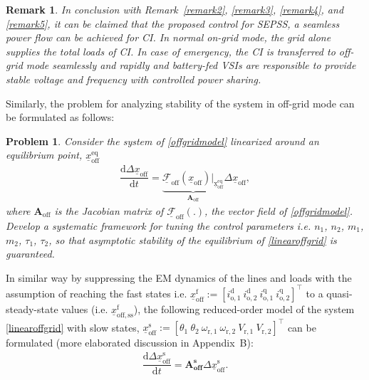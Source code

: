 \documentclass[journal]{IEEEtran}
\newtheorem{remark}{Remark}
\newtheorem{problem}{Problem}
\begin{document}
\begin{remark}
In conclusion with Remark~\ref{remark2}, \ref{remark3}, \ref{remark4}, and \ref{remark5}, it can be claimed that the proposed control for SEPSS, a seamless power flow can be achieved for CI. In normal on-grid mode, the grid alone supplies the total loads of CI. In case of emergency, the CI is transferred to off-grid mode seamlessly and rapidly and battery-fed VSIs are responsible to provide stable voltage and frequency with controlled power sharing. 
\end{remark}
Similarly, the problem for analyzing stability of the system in off-grid mode can be formulated as follows:
\begin{problem}\label{problem2}
Consider the system of \eqref{offgridmodel} linearized around an equilibrium point, $\underline{x}_\mathrm{off}^\mathrm{eq}$
\begin{align}\label{linearoffgrid}
    \dfrac{\mathrm{d}\Delta \underline{x}_\mathrm{off}}{\mathrm{d}t}=\underbrace{\mathcal{\underline{F}}_\mathrm{off}(\underline{x}_\mathrm{off})\big|_\mathrm{\underline{x}_\mathrm{off}^\mathrm{eq}}}_{\mathbf{A}_\mathrm{{off}}}\Delta \underline{x}_\mathrm{off},
\end{align}
where $\mathbf{A}_\mathrm{off}$ is the Jacobian matrix of $\mathcal{\underline{F}}_\mathrm{off}(.)$, the vector field of \eqref{offgridmodel}. Develop a systematic framework for tuning the control parameters i.e. $n_\mathrm{1}$, $n_\mathrm{2}$, $m_\mathrm{1}$, $m_\mathrm{2}$, $\tau_\mathrm{1}$, $\tau_\mathrm{2}$, so that asymptotic stability of the equilibrium of \eqref{linearoffgrid} is guaranteed.
\end{problem}
In similar way by suppressing the EM dynamics of the lines and loads with the assumption of reaching the fast states i.e. $\underline{x}_\mathrm{off}^\mathrm{f}:=[i_\mathrm{o,1}^\mathrm{d}~i_\mathrm{o,2}^\mathrm{d}~i_\mathrm{o,1}^\mathrm{q}~i_\mathrm{o,2}^\mathrm{q}]^\top$ to a  quasi-steady-state values (i.e. $\underline{x}_\mathrm{off,ss}^\mathrm{f}$), the following reduced-order model of the system \eqref{linearoffgrid} with slow states, $\underline{x}_\mathrm{off}^\mathrm{s}:=[\theta_\mathrm{1}~\theta_\mathrm{2}~\omega_\mathrm{r,1}~\omega_\mathrm{r,2}~V_\mathrm{r,1}~V_\mathrm{r,2}]^\top$ can be formulated (more elaborated discussion in Appendix~B):
\begin{align}\label{redlinearoffgrid}
        \dfrac{\mathrm{d}\Delta \underline{x}_\mathrm{off}^\mathrm{s}}{\mathrm{d}t}=\mathbf{A}_\mathrm{\textbf{off}}^\mathrm{\textbf{s}}\Delta \underline{x}_\mathrm{off}^\mathrm{s}.
\end{align}
\end{document}
